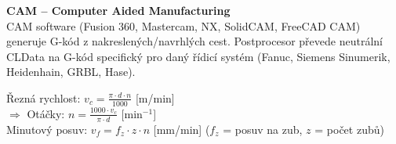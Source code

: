 \documentclass[a4paper,10pt]{article}
\begin{document}
\begin{vysvetlenibox}
\textbf{CAM -- Computer Aided Manufacturing}\\
CAM software (Fusion 360, Mastercam, NX, SolidCAM, FreeCAD CAM) generuje G-kód z nakreslených/navrhlých cest. Postprocesor převede neutrální CLData na G-kód specifický
pro daný řídicí systém (Fanuc, Siemens Sinumerik, Heidenhain, GRBL, Hase).

\begin{vzorcebox}
Řezná rychlost: $v_c = \frac{\pi \cdot d \cdot n}{1000}$ [m/min]\\
$\Rightarrow$ Otáčky: $n = \frac{1000 \cdot v_c}{\pi \cdot d}$ [min$^{-1}$]\\
Minutový posuv: $v_f = f_z \cdot z \cdot n$ [mm/min]
\quad ($f_z$ = posuv na zub, $z$ = počet zubů)
\end{vzorcebox}
\end{vysvetlenibox}


\end{document}
